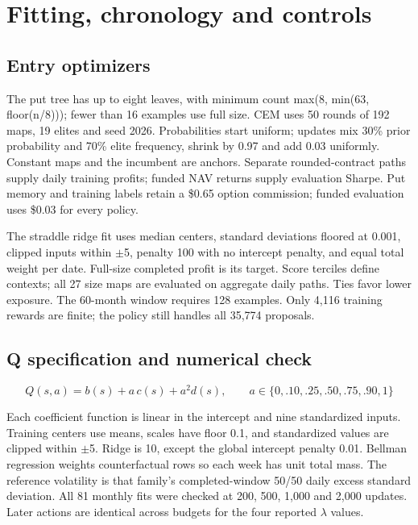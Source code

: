 \clearpage

\section{Fitting, chronology and controls}\label{app:b}

\subsection*{Entry optimizers}

The put tree has up to eight leaves, with minimum count max(8, min(63, floor(n/8))); fewer than 16 examples use full size. CEM uses 50 rounds of 192 maps, 19 elites and seed 2026. Probabilities start uniform; updates mix 30\% prior probability and 70\% elite frequency, shrink by 0.97 and add 0.03 uniformly. Constant maps and the incumbent are anchors. Separate rounded-contract paths supply daily training profits; funded NAV returns supply evaluation Sharpe. Put memory and training labels retain a \$0.65 option commission; funded evaluation uses \$0.03 for every policy.


The straddle ridge fit uses median centers, standard deviations floored at 0.001, clipped inputs within \(\pm\)5, penalty 100 with no intercept penalty, and equal total weight per date. Full-size completed profit is its target. Score terciles define contexts; all 27 size maps are evaluated on aggregate daily paths. Ties favor lower exposure. The 60-month window requires 128 examples. Only 4,116 training rewards are finite; the policy still handles all 35,774 proposals.


\subsection*{Q specification and numerical check}

\begin{equation*}Q(s,a)=b(s)+a\,c(s)+a^2d(s),\qquad a\in\{0,.10,.25,.50,.75,.90,1\}\end{equation*}

Each coefficient function is linear in the intercept and nine standardized inputs. Training centers use means, scales have floor 0.1, and standardized values are clipped within \(\pm\)5. Ridge is 10, except the global intercept penalty 0.01. Bellman regression weights counterfactual rows so each week has unit total mass. The reference volatility is that family's completed-window 50/50 daily excess standard deviation. All 81 monthly fits were checked at 200, 500, 1,000 and 2,000 updates. Later actions are identical across budgets for the four reported \(\lambda\) values.


